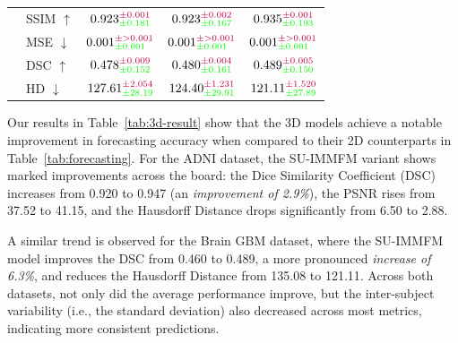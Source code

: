 \documentclass[twoside]{article}
\begin{document}
\begin{table}[h!]
\begin{tabular}{llccc}
 & SSIM $\uparrow$ & $0.923_{\textcolor{green}{\pm 0.181}}^{\textcolor{purple}{\pm 0.001}}$
                   & $0.923_{\textcolor{green}{\pm 0.167}}^{\textcolor{purple}{\pm 0.002}}$
                   & $0.935_{\textcolor{green}{\pm 0.193}}^{\textcolor{purple}{\pm 0.001}}$ \\[4pt]
 & MSE  $\downarrow$ & $0.001_{\textcolor{green}{\pm 0.001}}^{\textcolor{purple}{\pm >0.001}}$
                     & $0.001_{\textcolor{green}{\pm 0.001}}^{\textcolor{purple}{\pm >0.001}}$
                     & $0.001_{\textcolor{green}{\pm 0.001}}^{\textcolor{purple}{\pm >0.001}}$ \\[4pt]
 & DSC  $\uparrow$ & $0.478_{\textcolor{green}{\pm 0.152}}^{\textcolor{purple}{\pm 0.009}}$
                   & $0.480_{\textcolor{green}{\pm 0.161}}^{\textcolor{purple}{\pm 0.004}}$
                   & $0.489_{\textcolor{green}{\pm 0.150}}^{\textcolor{purple}{\pm 0.005}}$ \\[4pt]
 & HD   $\downarrow$ & $127.61_{\textcolor{green}{\pm 28.19}}^{\textcolor{purple}{\pm 2.054}}$
                     & $124.40_{\textcolor{green}{\pm 29.91}}^{\textcolor{purple}{\pm 1.231}}$
                     & $121.11_{\textcolor{green}{\pm 27.89}}^{\textcolor{purple}{\pm 1.520}}$ \\

\bottomrule
\end{tabular}
\end{table}

Our results in Table~\ref{tab:3d-result} show that the 3D models achieve a notable improvement in forecasting accuracy when compared to their 2D counterparts in Table~\ref{tab:forecasting}. For the ADNI dataset, the SU-IMMFM variant shows marked improvements across the board: the Dice Similarity Coefficient (DSC) increases from 0.920 to 0.947 (an \emph{improvement of 2.9\%}), the PSNR rises from 37.52 to 41.15, and the Hausdorff Distance drops significantly from 6.50 to 2.88.

A similar trend is observed for the Brain GBM dataset, where the SU-IMMFM model improves the DSC from 0.460 to 0.489, a more pronounced \emph{increase of 6.3\%}, and reduces the Hausdorff Distance from 135.08 to 121.11. Across both datasets, not only did the average performance improve, but the inter-subject variability (i.e., the standard deviation) also decreased across most metrics, indicating more consistent predictions.
\end{document}

